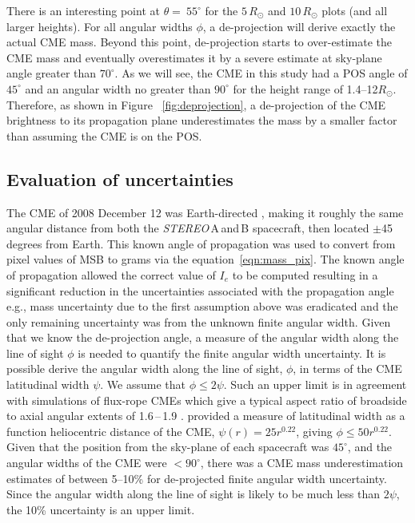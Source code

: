There is an interesting point at $\theta=~55^{\circ}$ for the $5\,R_{\odot}$ and $10\,R_{\odot}$ plots (and all larger heights). For all angular widths $\phi$, a de-projection will derive exactly the actual CME mass. Beyond this point, de-projection starts to over-estimate the CME mass and eventually overestimates it by a severe estimate at sky-plane angle greater than $70^{\circ}$. As we will see, the CME in this study had a POS angle of $45^{\circ}$ and an angular width no greater than $90^{\circ}$ for the height range of 1.4--12$R_{\odot}$. Therefore, as shown in Figure ~\ref{fig:deprojection}, a de-projection of the CME brightness to its propagation plane underestimates the mass by a smaller factor than assuming the CME is on the POS.


\subsection{Evaluation of uncertainties}
The CME of 2008 December 12 was Earth-directed \citep{byrne2010}, making it roughly the same angular distance from both the \emph{STEREO}\,A\,and\,B spacecraft, then located $\pm$45 degrees from Earth. This known angle of propagation was used to convert from pixel values of MSB to grams via the equation~\ref{eqn:mass_pix}.
The known angle of propagation allowed the correct value of $I_{e}$ to be computed resulting in a significant reduction in the uncertainties associated with the propagation angle e.g., mass uncertainty due to the first assumption above was eradicated and the only remaining uncertainty was from the unknown finite angular width. Given that we know the de-projection angle, a measure of the angular width along the line of sight $\phi$ is needed to quantify the finite angular width uncertainty. It is possible derive the angular width along the line of sight, $\phi$, in terms of the CME latitudinal width $\psi$. We assume that $\phi \leqslant 2\psi$.  Such an upper limit is in agreement with simulations of flux-rope CMEs which give a typical aspect ratio of broadside to axial angular extents of 1.6\,--\,1.9 \citep{krall2006}. \citet{byrne2010} provided a measure of latitudinal width as a function heliocentric distance of the CME, $\psi(r)=25r^{0.22}$, giving $\phi \leqslant 50r^{0.22}$. Given that the position from the sky-plane of each spacecraft was $45^{\circ}$, and the angular widths of the CME were $<90^{\circ}$, there was a CME mass underestimation estimates of between 5--10\% for de-projected finite angular width uncertainty. Since the angular width along the line of sight is likely to be much less than $2\psi$, the 10\% uncertainty is an upper limit.


